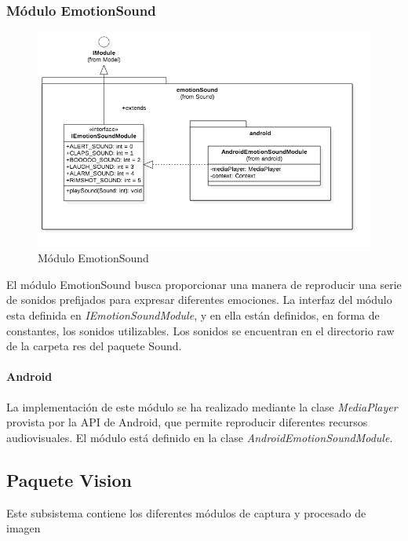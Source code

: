 \subsubsection{Módulo EmotionSound}
\begin{figure}
	\centering
	\includegraphics[width=1\linewidth]{imagenes/diagramas/EmotionSoundModule.png}
	\caption{Módulo EmotionSound}
	\label{fig:emotion-sound-module}
\end{figure}
El módulo EmotionSound busca proporcionar una manera de reproducir una serie de sonidos prefijados para expresar diferentes emociones.
La interfaz del módulo esta definida en \textit{IEmotionSoundModule}, y en ella están definidos, en forma de constantes, los sonidos utilizables.
Los sonidos se encuentran en el directorio raw de la carpeta res del paquete Sound.
\paragraph*{Android\\}

La implementación de este módulo se ha realizado mediante la clase \textit{MediaPlayer} provista por la API de Android, que permite reproducir diferentes recursos audiovisuales. El módulo está definido en la clase \textit{AndroidEmotionSoundModule}.



\newpage
\subsection{Paquete Vision}
Este subsistema contiene los diferentes módulos de captura y procesado de imagen
